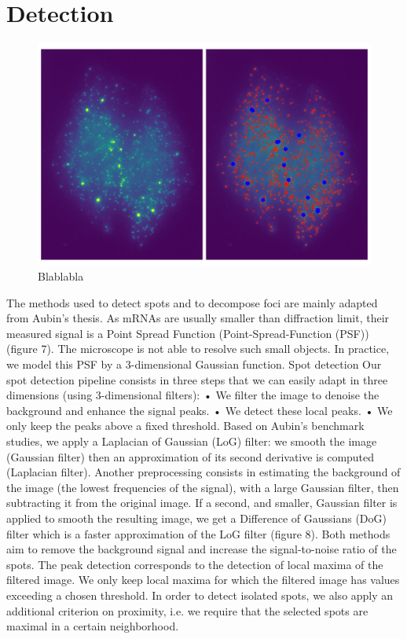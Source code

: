 
\graphicspath{{./figures/chapter2/}}


\chapter{Detection} \label{chap:chapter2}
\minitoc
\newpage


\begin{figure}[h]
    \centering
    \includegraphics[width=1\textwidth]{figures/chapter2/cluster_detection_results}
    \caption{Blablabla}
    \label{fig:detection_results}
\end{figure}


The methods used to detect spots and to decompose foci are mainly adapted from
Aubin’s thesis. As mRNAs are usually smaller than diffraction limit, their measured
signal is a Point Spread Function (Point-Spread-Function (PSF)) (figure 7). The
microscope is not able to resolve such small objects. In
practice, we model this PSF by a 3-dimensional Gaussian function.
Spot detection Our spot detection pipeline consists in three steps that we can
easily adapt in three dimensions (using 3-dimensional filters):
• We filter the image to denoise the background and enhance the signal peaks.
• We detect these local peaks.
• We only keep the peaks above a fixed threshold.
Based on Aubin’s benchmark studies, we apply a Laplacian of Gaussian (LoG)
filter: we smooth the image (Gaussian filter) then an approximation of its
second derivative is computed (Laplacian filter). Another preprocessing consists
in estimating the background of the image (the lowest frequencies of the signal),
with a large Gaussian filter, then subtracting it from the original image. If a
second, and smaller, Gaussian filter is applied to smooth the resulting image,
we get a Difference of Gaussians (DoG) filter which is a faster approximation of
the LoG filter (figure 8). Both methods aim to remove the background signal and
increase the signal-to-noise ratio of the spots. The peak detection corresponds
to the detection of local maxima of the filtered image. We only keep local maxima
for which the filtered image has values exceeding a chosen threshold. In order
to detect isolated spots, we also apply an additional criterion on proximity,
i.e. we require that the selected spots are maximal in a certain neighborhood.

